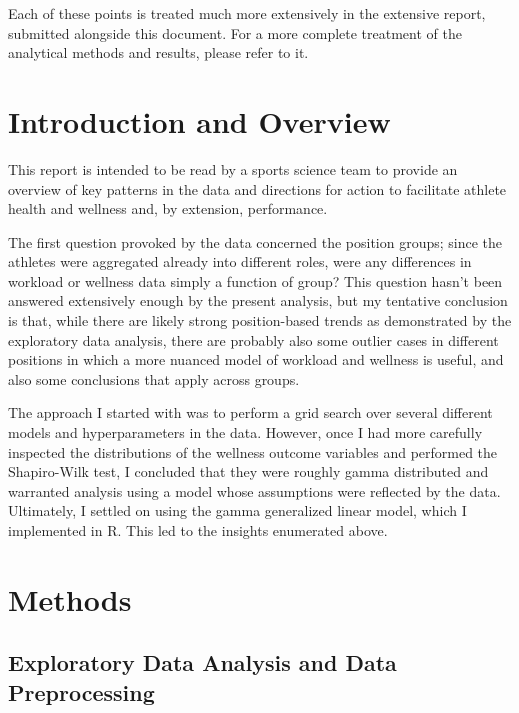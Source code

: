 \documentclass{article}
\begin{document}
		Each of these points is treated much more extensively in the
		extensive report, submitted alongside this document. For a
		more complete treatment of the analytical methods and results,
		please refer to it.

	\section{Introduction and Overview}

		This report is intended to be read by a sports science team to provide
		an overview of key patterns in the data and directions for action
		to facilitate athlete health and wellness and, by extension, performance.

		The first question provoked by the data concerned the position groups;
		since the athletes were aggregated already into different roles, were
		any differences in workload or wellness data simply a function of group?
		This question hasn't been answered extensively enough by the present
		analysis, but my tentative conclusion is that, while there are likely strong
		position-based trends as demonstrated by the exploratory data analysis,
		there are probably also some outlier cases in different positions in which
		a more nuanced model of workload and wellness is useful, and also some
		conclusions that apply across groups.

		The approach I started with was to perform a grid search over several
		different models and hyperparameters in the data. However, once I had
		more carefully inspected the distributions of the wellness outcome
		variables and performed the Shapiro-Wilk test, I concluded that they
		were roughly gamma distributed and warranted analysis using a model
		whose assumptions were reflected by the data. Ultimately, I settled
		on using the gamma generalized linear model, which I implemented in
		R. This led to the insights enumerated above.

	\section{Methods}

		\subsection{Exploratory Data Analysis and Data Preprocessing}
\end{document}

